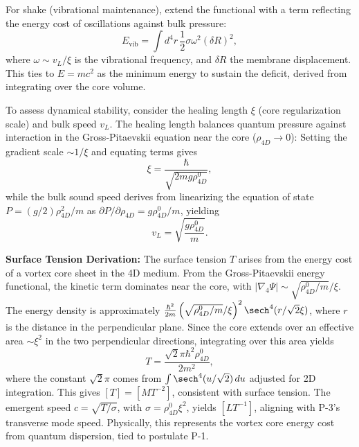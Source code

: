 For shake (vibrational maintenance), extend the functional with a term reflecting the energy cost of oscillations against bulk pressure:
\begin{equation}
E_{\text{vib}} = \int d^4 r \, \frac{1}{2} \sigma \omega^2 (\delta R)^2,
\end{equation}
where $\omega \sim v_L / \xi$ is the vibrational frequency, and $\delta R$ the membrane displacement. This ties to $E=mc^2$ as the minimum energy to sustain the deficit, derived from integrating over the core volume.

To assess dynamical stability, consider the healing length $\xi$ (core regularization scale) and bulk speed $v_L$. The healing length balances quantum pressure against interaction in the Gross-Pitaevskii equation near the core ($\rho_{4D} \to 0$): Setting the gradient scale $\sim 1/\xi$ and equating terms gives
\begin{equation}
\xi = \frac{\hbar}{\sqrt{2 m g \rho_{4D}^0}},
\end{equation}
while the bulk sound speed derives from linearizing the equation of state $P = (g/2) \rho_{4D}^2 / m$ as $\partial P / \partial \rho_{4D} = g \rho_{4D}^0 / m$, yielding
\begin{equation}
v_L = \sqrt{\frac{g \rho_{4D}^0}{m}}.
\end{equation}

\textbf{Surface Tension Derivation:} The surface tension $T$ arises from the energy cost of a vortex core sheet in the 4D medium. From the Gross-Pitaevskii energy functional, the kinetic term dominates near the core, with $|\nabla_4 \Psi| \sim \sqrt{\rho_{4D}^0 / m} / \xi$. The energy density is approximately $\frac{\hbar^2}{2m} \left( \sqrt{\rho_{4D}^0 / m} / \xi \right)^2 \sech^4(r / \sqrt{2} \xi)$, where $r$ is the distance in the perpendicular plane. Since the core extends over an effective area $\sim \xi^2$ in the two perpendicular directions, integrating over this area yields
\begin{equation}
T = \frac{\sqrt{2} \pi \hbar^2 \rho_{4D}^0}{2 m^2},
\end{equation}
where the constant $\sqrt{2} \pi$ comes from $\int \sech^4(u / \sqrt{2}) \, du$ adjusted for 2D integration. This gives $[T] = [M T^{-2}]$, consistent with surface tension. The emergent speed $c = \sqrt{T / \sigma}$, with $\sigma = \rho_{4D}^0 \xi^2$, yields $[L T^{-1}]$, aligning with P-3's transverse mode speed. Physically, this represents the vortex core energy cost from quantum dispersion, tied to postulate P-1.


